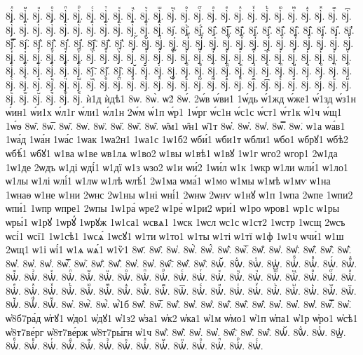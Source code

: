 {8ј҅ⷧ.
8ј҅ⷨ.
8ј҅ⷩ.
8ј҅ⷪ.
8ј҅ⷫ.
8ј҅ⷬ.
8ј҅ⷭ.
8ј҅ⷮ.
8ј҅ⷯ.
8ј҅ⷰ.
8ј҅ⷱ.
8ј҅ⷲ.
8ј҅ⷳ.
8ј҅ⷴ.
8ј҅ⷵ.
8ј҅ⷶ.
8ј҅ⷷ.
8ј҅ⷸ.
8ј҅ⷹ.
8ј҅ⷺ.
8ј҅ⷻ.
8ј҅ⷼ.
8ј҅ⷽ.
8ј҅ⷾ.
8ј҅ⷿ.
8ј҅꙯.
8ј҅ꙴ.
8ј҅ꙵ.
8ј҅ꙶ.
8ј҅ꙷ.
8ј҅ꙸ.
8ј҅ꙹ.
8ј҅ꙺ.
8ј҅ꙻ.
8ј҅꙼.
8ј҅꙽.
8ј҅ꚞ.
8ј҅ꚟ.
8ј҆.
8ј҆̀.
8ј҆́.
8ј҆̂.
8ј҆̅.
8ј҆̆.
8ј҆̇.
8ј҆̈.
8ј҆̋.
8ј҆̏.
8ј҆̑.
8ј҆̓.
8ј҆̔.
8ј҆̾.
8ј҆̿.
8ј҆͘.
8ј҆҃.
8ј҆҄.
8ј҆҅.
8ј҆҆.
8ј҆҇.
8ј҆᷀.
8ј҆᷁.
8ј҆᷶.
8ј᷷҆.
8ј᷸҆.
8ј᷹҆.
8ј҆ⷠ.
8ј҆ⷡ.
8ј҆ⷢ.
8ј҆ⷣ.
8ј҆ⷤ.
8ј҆ⷥ.
8ј҆ⷦ.
8ј҆ⷧ.
8ј҆ⷨ.
8ј҆ⷩ.
8ј҆ⷪ.
8ј҆ⷫ.
8ј҆ⷬ.
8ј҆ⷭ.
8ј҆ⷮ.
8ј҆ⷯ.
8ј҆ⷰ.
8ј҆ⷱ.
8ј҆ⷲ.
8ј҆ⷳ.
8ј҆ⷴ.
8ј҆ⷵ.
8ј҆ⷶ.
8ј҆ⷷ.
8ј҆ⷸ.
8ј҆ⷹ.
8ј҆ⷺ.
8ј҆ⷻ.
8ј҆ⷼ.
8ј҆ⷽ.
8ј҆ⷾ.
8ј҆ⷿ.
8ј҆꙯.
8ј҆ꙴ.
8ј҆ꙵ.
8ј҆ꙶ.
8ј҆ꙷ.
8ј҆ꙸ.
8ј҆ꙹ.
8ј҆ꙺ.
8ј҆ꙻ.
8ј҆꙼.
8ј҆꙽.
8ј҆ꚞ.
8ј҆ꚟ.
8ј҇.
8ј᷀.
8ј᷁.
8ј᷶.
8ј᷷.
8ј᷸.
8ј᷹.
8јⷠ.
8јⷡ.
8јⷢ.
8јⷣ.
8јⷤ.
8јⷥ.
8јⷦ.
8јⷧ.
8јⷨ.
8јⷩ.
8јⷪ.
8јⷫ.
8јⷬ.
8јⷭ.
8јⷮ.
8јⷯ.
8јⷰ.
8јⷱ.
8јⷲ.
8јⷳ.
8јⷴ.
8јⷵ.
8јⷶ.
8јⷷ.
8јⷸ.
8јⷹ.
8јⷺ.
8јⷻ.
8јⷼ.
8јⷽ.
8јⷾ.
8јⷿ.
8ј꙯.
8јꙴ.
8јꙵ.
8јꙶ.
8јꙷ.
8јꙸ.
8јꙹ.
8јꙺ.
8јꙻ.
8ј꙼.
8ј꙽.
8јꚞ.
8јꚟ.
ѝ1д
ѝдѣ1
8ѡ.
8ѡ̀.
ѡ2́
8ѡ́.
2ѡ́в
ѡ́ви1
1ѡ́дь
ѡ́1жд
ѡ́же1
ѡ́1зд
ѡ́з1н
ѡ́ин1
ѡ́и1х
ѡ́л1г
ѡ́ли1
ѡ́л1н
2ѡ́м
ѡ́1п
ѡ́р1
1ѡ́рг
ѡ́с1н
ѡ́с1с
ѡ́ст1
ѡ́т1к
ѡ́1ч
ѡ́щ1
1ѡ́ѳ
8ѡ̂.
8ѡ̅.
8ѡ̆.
8ѡ̇.
8ѡ̈.
8ѡ̋.
8ѡ̏.
8ѡ̑.
ѡ̑м1
ѡ̑н1
ѡ̑1т
8ѡ̓.
8ѡ̔.
8ѡ̾.
8ѡ̿.
8ѡ͘.
ѡ1а
ѡа́в1
1ѡа́д
1ѡа́н
1ѡа́с
1ѡак
1ѡа2н1
1ѡа1с
1ѡ1б2
ѡби́1
ѡби1т
ѡбли1
ѡбо1
ѡбрꙋ1
ѡбѣ2
ѡбѣ́1
ѡбꙋ1
ѡ1ва
ѡ1ве
ѡв1лѧ
ѡ1во2
ѡ1вы
ѡ1вѣ1
ѡ1вꙋ
1ѡ1г
ѡго2
ѡгор1
2ѡ1да
1ѡ1де
2ѡдъ
ѡ1ді
ѡді́1
ѡ1дї
ѡ1з
ѡзо2
ѡ1и
ѡи́2
1ѡи́л
ѡ1к
1ѡкр
ѡ1ли
ѡли́1
ѡ1ло1
ѡ1лы
ѡ1лі
ѡлі́1
ѡ1лѡ
ѡ1лѣ
ѡлѣ́1
2ѡ1ма
ѡма́1
ѡ1мо
ѡ1мы
ѡ1мѣ
ѡ1мѵ
ѡ1на
1ѡнаѳ
ѡ1не
ѡ1ни
2ѡнс
2ѡ1ны
ѡ1ні
ѡні́1
2ѡнѡ
2ѡнѵ
ѡ1нꙋ
ѡ1п
1ѡпа
2ѡпе
1ѡпи2
ѡпи́1
1ѡпр
ѡпре1
2ѡпы
1ѡ1ра́
ѡре2
ѡ1ре́
ѡ1ри2
ѡри́1
ѡ1ро
ѡров1
ѡр1с
ѡ1ры
ѡры́1
ѡ1рꙋ
1ѡрꙋ́
1ѡрꙋж
1ѡ1са1
ѡсвѧ1
1ѡск
1ѡсл
ѡс1с
ѡ1ст2
1ѡстр
1ѡсщ
2ѡсъ
ѡсі́1
ѡсї1
1ѡ1сѣ1
1ѡсѧ́
1ѡсꙋ1
ѡ1ти
ѡ1то1
ѡ1ты
ѡ1ті
ѡ1тї
ѡ1ф
1ѡ1ч
ѡчи́1
ѡ1ш
2ѡщ1
ѡ1і
ѡі́1
ѡ1ѧ
ѡѧ́1
ѡ1ѷ1
8ѡ҃.
8ѡ҄.
8ѡ҅.
8ѡ҅̀.
8ѡ҅́.
8ѡ҅̂.
8ѡ҅̅.
8ѡ҅̆.
8ѡ҅̇.
8ѡ҅̈.
8ѡ҅̋.
8ѡ҅̏.
8ѡ҅̑.
8ѡ҅̓.
8ѡ҅̔.
8ѡ҅̾.
8ѡ҅̿.
8ѡ҅͘.
8ѡ҅҃.
8ѡ҅҄.
8ѡ҅҅.
8ѡ҅҆.
8ѡ҅҇.
8ѡ҅᷀.
8ѡ҅᷁.
8ѡ҅᷶.
8ѡ᷷҅.
8ѡ᷸҅.
8ѡ᷹҅.
8ѡ҅ⷠ.
8ѡ҅ⷡ.
8ѡ҅ⷢ.
8ѡ҅ⷣ.
8ѡ҅ⷤ.
8ѡ҅ⷥ.
8ѡ҅ⷦ.
8ѡ҅ⷧ.
8ѡ҅ⷨ.
8ѡ҅ⷩ.
8ѡ҅ⷪ.
8ѡ҅ⷫ.
8ѡ҅ⷬ.
8ѡ҅ⷭ.
8ѡ҅ⷮ.
8ѡ҅ⷯ.
8ѡ҅ⷰ.
8ѡ҅ⷱ.
8ѡ҅ⷲ.
8ѡ҅ⷳ.
8ѡ҅ⷴ.
8ѡ҅ⷵ.
8ѡ҅ⷶ.
8ѡ҅ⷷ.
8ѡ҅ⷸ.
8ѡ҅ⷹ.
8ѡ҅ⷺ.
8ѡ҅ⷻ.
8ѡ҅ⷼ.
8ѡ҅ⷽ.
8ѡ҅ⷾ.
8ѡ҅ⷿ.
8ѡ҅꙯.
8ѡ҅ꙴ.
8ѡ҅ꙵ.
8ѡ҅ꙶ.
8ѡ҅ꙷ.
8ѡ҅ꙸ.
8ѡ҅ꙹ.
8ѡ҅ꙺ.
8ѡ҅ꙻ.
8ѡ҅꙼.
8ѡ҅꙽.
8ѡ҅ꚞ.
8ѡ҅ꚟ.
8ѡ҆.
8ѡ҆̀.
8ѡ҆́.
ѡ҆́1б
8ѡ҆̂.
8ѡ҆̅.
8ѡ҆̆.
8ѡ҆̇.
8ѡ҆̈.
8ѡ҆̋.
8ѡ҆̏.
8ѡ҆̑.
8ѡ҆̓.
8ѡ҆̔.
8ѡ҆̾.
8ѡ҆̿.
8ѡ҆͘.
ѡ҆8б7ра́д
ѡ҆гꙋ1
ѡ҆до1
ѡ҆дꙋ1
ѡ҆1з2
ѡ҆за1
ѡ҆к2
ѡ҆ка1
ѡ҆1м
ѡ҆мо1
ѡ҆1п
ѡ҆па1
ѡ҆1р
ѡ҆ро1
ѡ҆сѣ1
ѡ҆8т7ве́рг
ѡ҆8т7ве́рж
ѡ҆8т7ры́гн
ѡ҆1ч
8ѡ҆҃.
8ѡ҆҄.
8ѡ҆҅.
8ѡ҆҆.
8ѡ҆҇.
8ѡ҆᷀.
8ѡ҆᷁.
8ѡ҆᷶.
8ѡ᷷҆.
8ѡ᷸҆.
8ѡ᷹҆.
8ѡ҆ⷠ.
8ѡ҆ⷡ.
8ѡ҆ⷢ.
8ѡ҆ⷣ.
8ѡ҆ⷤ.
8ѡ҆ⷥ.
8ѡ҆ⷦ.
8ѡ҆ⷧ.
8ѡ҆ⷨ.
8ѡ҆ⷩ.
8ѡ҆ⷪ.
8ѡ҆ⷫ.
8ѡ҆ⷬ.
8ѡ҆ⷭ.
}
